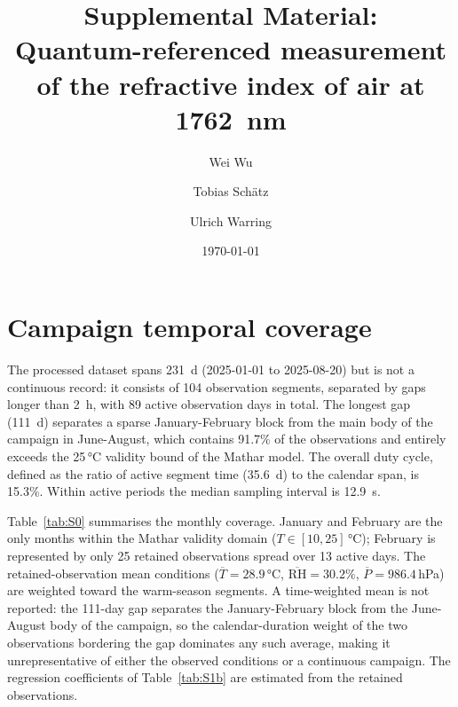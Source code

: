 \documentclass[aps,prapplied,reprint,superscriptaddress]{revtex4-2}
\begin{document}
\title{Supplemental Material: \\
   Quantum-referenced measurement of the refractive index of air at \SI{1762}{\nano\meter}}

\author{Wei Wu}
\author{Tobias Sch{\"a}tz}
\author{Ulrich Warring}

\date{\today}

\maketitle

\section{Campaign temporal coverage}
\label{sec:S0}

The processed dataset spans \SI{231}{\day} (2025-01-01 to 2025-08-20) but is not a continuous record: it consists of 104 observation segments, separated by gaps longer than \SI{2}{\hour}, with 89 active observation days in total. The longest gap (\SI{111}{\day}) separates a sparse January-February block from the main body of the campaign in June-August, which contains 91.7\% of the observations and entirely exceeds the 25\,\si{\celsius} validity bound of the Mathar model. The overall duty cycle, defined as the ratio of active segment time (\SI{35.6}{\day}) to the calendar span, is 15.3\%. Within active periods the median sampling interval is \SI{12.9}{\second}.

Table~\ref{tab:S0} summarises the monthly coverage. January and February are the only months within the Mathar validity domain ($T \in [10,25]\,\si{\celsius}$); February is represented by only 25 retained observations spread over 13 active days. The retained-observation mean conditions ($\overline{T} = 28.9\,\si{\celsius}$, $\overline{\mathrm{RH}} = 30.2\%$, $\overline{P} = 986.4$\,hPa) are weighted toward the warm-season segments. A time-weighted mean is not reported: the 111-day gap separates the January-February block from the June-August body of the campaign, so the calendar-duration weight of the two observations bordering the gap dominates any such average, making it unrepresentative of either the observed conditions or a continuous campaign. The regression coefficients of Table~\ref{tab:S1b} are estimated from the retained observations.
\end{document}
